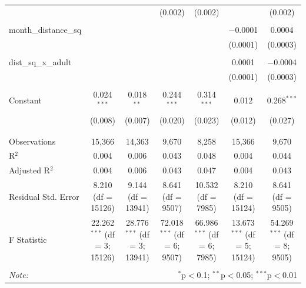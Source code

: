 \documentclass{beamer}
\begin{document}
\begin{frame}
\begin{table}[!htbp]
{\begin{tabular}{@{\extracolsep{5pt}}lcccccc}
			&  &  & (0.002) & (0.002) &  & (0.002) \\ 
			& & & & & & \\ 
			month\_distance\_sq &  &  &  &  & $-$0.0001 & 0.0004 \\ 
			&  &  &  &  & (0.0001) & (0.0003) \\ 
			& & & & & & \\ 
			dist\_sq\_x\_adult &  &  &  &  & 0.0001 & $-$0.0004 \\ 
			&  &  &  &  & (0.0001) & (0.0003) \\ 
			& & & & & & \\ 
			Constant & 0.024$^{***}$ & 0.018$^{**}$ & 0.244$^{***}$ & 0.314$^{***}$ & 0.012 & 0.268$^{***}$ \\ 
			& (0.008) & (0.007) & (0.020) & (0.023) & (0.012) & (0.027) \\ 
			& & & & & & \\ 
			\hline \\[-1.8ex] 
			Observations & 15,366 & 14,363 & 9,670 & 8,258 & 15,366 & 9,670 \\ 
			R$^{2}$ & 0.004 & 0.006 & 0.043 & 0.048 & 0.004 & 0.044 \\ 
			Adjusted R$^{2}$ & 0.004 & 0.006 & 0.043 & 0.047 & 0.004 & 0.043 \\ 
			Residual Std. Error & 8.210 (df = 15126) & 9.144 (df = 13941) & 8.641 (df = 9507) & 10.532 (df = 7985) & 8.210 (df = 15124) & 8.641 (df = 9505) \\ 
			F Statistic & 22.262$^{***}$ (df = 3; 15126) & 28.776$^{***}$ (df = 3; 13941) & 72.018$^{***}$ (df = 6; 9507) & 66.986$^{***}$ (df = 6; 7985) & 13.673$^{***}$ (df = 5; 15124) & 54.269$^{***}$ (df = 8; 9505) \\ 
			\hline 
			\hline \\[-1.8ex] 
			\textit{Note:}  & \multicolumn{6}{r}{$^{*}$p$<$0.1; $^{**}$p$<$0.05; $^{***}$p$<$0.01} \\ 
		\end{tabular} }
	\end{table}  
\end{frame}
\end{document}
